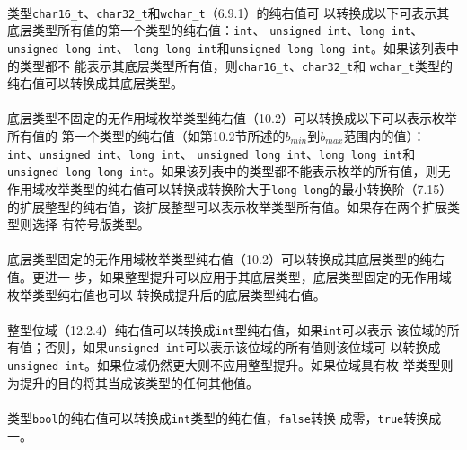 \paragraph{}
类型\texttt{char16\_t}、\texttt{char32\_t}和\texttt{wchar\_t}（6.9.1）的纯右值可
以转换成以下可表示其底层类型所有值的第一个类型的纯右值：\texttt{int}、
\texttt{unsigned int}、\texttt{long int}、\texttt{unsigned long int}、
\texttt{long long int}和\texttt{unsigned long long int}。如果该列表中的类型都不
能表示其底层类型所有值，则\texttt{char16\_t}、\texttt{char32\_t}和
\texttt{wchar\_t}类型的纯右值可以转换成其底层类型。

\paragraph{}
底层类型不固定的无作用域枚举类型纯右值（10.2）可以转换成以下可以表示枚举所有值的
第一个类型的纯右值（如第10.2节所述的$b_{min}$到$b_{max}$范围内的值）：
\texttt{int}、\texttt{unsigned int}、\texttt{long int}、
\texttt{unsigned long int}、\texttt{long long int}和
\texttt{unsigned long long int}。如果该列表中的类型都不能表示枚举的所有值，则无
作用域枚举类型的纯右值可以转换成转换阶大于\texttt{long long}的最小转换阶（7.15）
的扩展整型的纯右值，该扩展整型可以表示枚举类型所有值。如果存在两个扩展类型则选择
有符号版类型。

\paragraph{}
底层类型固定的无作用域枚举类型纯右值（10.2）可以转换成其底层类型的纯右值。更进一
步，如果整型提升可以应用于其底层类型，底层类型固定的无作用域枚举类型纯右值也可以
转换成提升后的底层类型纯右值。

\paragraph{}
整型位域（12.2.4）纯右值可以转换成\texttt{int}型纯右值，如果\texttt{int}可以表示
该位域的所有值；否则，如果\texttt{unsigned int}可以表示该位域的所有值则该位域可
以转换成\texttt{unsigned int}。如果位域仍然更大则不应用整型提升。如果位域具有枚
举类型则为提升的目的将其当成该类型的任何其他值。

\paragraph{}
类型\texttt{bool}的纯右值可以转换成\texttt{int}类型的纯右值，\texttt{false}转换
成零，\texttt{true}转换成一。

